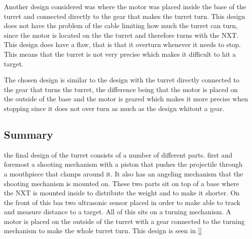 Another design considered was where the motor was placed inside the base of the
turret and connected directly to the gear that makes the turret turn. This
design does not have the problem of the cable limiting how much the turret can
turn, since the motor is located on the the turret and therefore turns with the
NXT. This design does have a flaw, that is that it overturn whenever it needs to
stop. This means that the turret is not very precise which makes it difficult to
hit a target.\nl

The chosen design is similar to the design with the turret directly connected to
the gear that turns the turret, the difference being that the motor is placed on
the outside of the base and the motor is geared which makes it more precise when
stopping since it does not over turn as much as the design whitout a gear. 

\subsection{Summary}
the final design of the turret consists of a number of different parts. first
and foremost a shooting mechanism with a piston that pushes the projectile
through a mouthpiece that clamps around it. It also has an angeling mechanism
that the shooting mechanism is mounted on. These two parts sit on top of a
base where the NXT is mounted inside to distribute the weight and to make it
shorter. On the front of this bas two ultrasonic sensor placed in order to make
\name able to track and measure distance to a target. All of this sits on a
turning mechanism. A motor is placed on the outside of the
turret with a gear connected to the turning mechanism to make the whole turret
turn. This design is seen in \autoref{}
